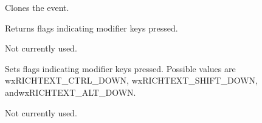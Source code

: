 
Clones the event.

\label{wxrichtexteventgetflags}


Returns flags indicating modifier keys pressed.

\label{wxrichtexteventgetindex}


Not currently used.

\label{wxrichtexteventsetflags}


Sets flags indicating modifier keys pressed. Possible values are wxRICHTEXT\_CTRL\_DOWN,
wxRICHTEXT\_SHIFT\_DOWN, andwxRICHTEXT\_ALT\_DOWN.

\label{wxrichtexteventsetindex}


Not currently used.
